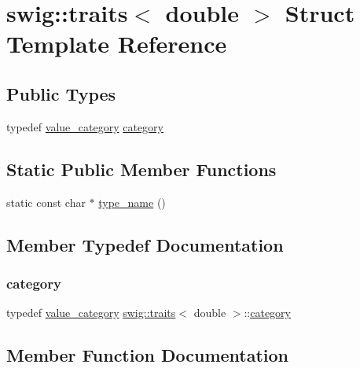 \hypertarget{structswig_1_1traits_3_01double_01_4}{}\section{swig\+:\+:traits$<$ double $>$ Struct Template Reference}
\label{structswig_1_1traits_3_01double_01_4}
\subsection*{Public Types}
\begin{DoxyCompactItemize}
\item 
typedef \hyperlink{structswig_1_1value__category}{value\+\_\+category} \hyperlink{structswig_1_1traits_3_01double_01_4_a003467ac91b8ca5a649cdf68f82ab7de}{category}
\end{DoxyCompactItemize}
\subsection*{Static Public Member Functions}
\begin{DoxyCompactItemize}
\item 
static const char $\ast$ \hyperlink{structswig_1_1traits_3_01double_01_4_a2474db5e0109bff332ac101c976a8b22}{type\+\_\+name} ()
\end{DoxyCompactItemize}


\subsection{Member Typedef Documentation}
\mbox{\label{structswig_1_1traits_3_01double_01_4_a003467ac91b8ca5a649cdf68f82ab7de}} 
\subsubsection{\texorpdfstring{category}{category}}
{\footnotesize\ttfamily typedef \hyperlink{structswig_1_1value__category}{value\+\_\+category} \hyperlink{structswig_1_1traits}{swig\+::traits}$<$ double $>$\+::\hyperlink{structswig_1_1traits_3_01double_01_4_a003467ac91b8ca5a649cdf68f82ab7de}{category}}



\subsection{Member Function Documentation}
\mbox{\label{structswig_1_1traits_3_01double_01_4_a2474db5e0109bff332ac101c976a8b22}} 
